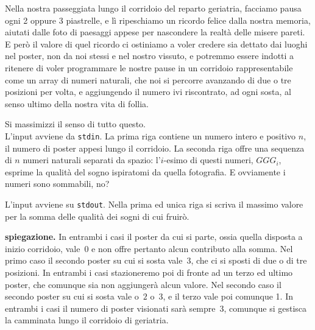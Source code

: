 \renewcommand{\nomebreve}{two\_three\_steps}
\renewcommand{\titolo}{Better two or three steps?}

\introduzione{}

Nella nostra passeggiata lungo il corridoio del reparto geriatria,
facciamo pausa ogni 2 oppure 3 piastrelle, e lì ripeschiamo un ricordo felice dalla nostra memoria, aiutati dalle foto di paesaggi appese per nascondere la realtà delle misere pareti.
E però il valore di quel ricordo ci ostiniamo a voler credere sia dettato dai luoghi nel poster, non da noi stessi e nel nostro vissuto, e potremmo essere indotti a ritenere di voler programmare le nostre pause in un corridoio rappresentabile come un array di numeri naturali, che noi si percorre avanzando di due o tre posizioni per volta, e aggiungendo il numero ivi riscontrato, ad ogni sosta, al senso ultimo della nostra vita di follia.


  Si massimizzi il senso di tutto questo.\\


L'input avviene da \verb'stdin'. La prima riga contiene un numero intero e positivo $n$, il numero di poster appesi lungo il corridoio.
La seconda riga offre una sequenza di $n$ numeri naturali separati da spazio:
l'$i$-esimo di questi numeri, $GGG_i$, esprime la qualità del sogno ispiratomi da quella fotografia. E ovviamente i numeri sono sommabili, no?

L'input avviene su \verb'stdout'. Nella prima ed unica riga si scriva il massimo valore per la somma delle qualità dei sogni di cui fruirò.\\



{\bf spiegazione.} In entrambi i casi il poster da cui si parte, ossia quella disposta a inizio corridoio, vale~$0$ e non offre pertanto alcun contributo alla somma.
Nel primo caso il secondo poster su cui si sosta vale~$3$, che ci si sposti di due o di tre posizioni. In entrambi i casi stazioneremo poi di fronte ad un terzo ed ultimo poster, che comunque sia non aggiungerà alcun valore.
Nel secondo caso il secondo poster su cui si sosta vale o~$2$ o~$3$, e il terzo vale poi comunque 1.
In entrambi i casi il numero di poster visionati sarà sempre~3, comunque si gestisca la camminata lungo il corridoio di geriatria.


